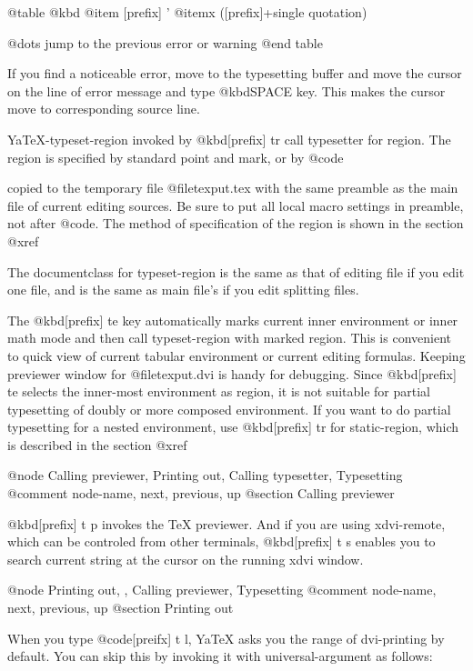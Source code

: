 @table @kbd
@item [prefix] '
@itemx ([prefix]+single quotation)

        @dots{} jump to the previous error or warning
@end table

  If you find a noticeable error, move to the typesetting buffer and move
the cursor on the line of error message and type @kbd{SPACE} key.  This
makes the cursor move to corresponding source line.

  YaTeX-typeset-region invoked by @kbd{[prefix] tr} call typesetter
for region.  The region is specified by standard point and mark, or
by @code{%
copied to the temporary file @file{texput.tex} with the same preamble
as the main file of current editing sources.  Be sure to put
all local macro settings in preamble, not after @code{}.
  The method of specification of the region is shown in the
section @xref{%

  The documentclass  for typeset-region is the same as that of editing
file if you edit one  file,  and is the same as main file's if you
edit splitting files.

  The @kbd{[prefix] te} key automatically marks current inner environment
or inner math mode and then call typeset-region with marked region.  This
is convenient to quick view of current tabular environment or current
editing formulas.  Keeping previewer window for @file{texput.dvi} is handy
for debugging.  Since @kbd{[prefix] te} selects the inner-most environment
as region, it is not suitable for partial typesetting of doubly or more
composed environment.  If you want to do partial typesetting for a nested
environment, use @kbd{[prefix] tr} for static-region, which is described
in the section @xref{%

@node Calling previewer, Printing out, Calling typesetter, Typesetting
@comment  node-name,  next,  previous,  up
@section Calling previewer

  @kbd{[prefix] t p} invokes the TeX previewer.  And if you are using
xdvi-remote, which can be controled from other terminals, @kbd{[prefix] t
s} enables you to search current string at the cursor on the running xdvi
window.

@node Printing out,  , Calling previewer, Typesetting
@comment  node-name,  next,  previous,  up
@section Printing out

  When you type @code{[preifx] t l}, YaTeX asks you the range of
dvi-printing by default.  You can skip this by invoking it with
universal-argument as follows:

}}}
